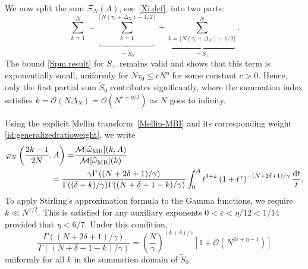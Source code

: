 \documentclass[pdflatex,sn-mathphys-num]{sn-jnl}
\theoremstyle{thmstyleone}
\numberwithin{equation}{section}
\begin{document}
We now split the sum $\Xi_N(A)$, see~\eqref{Xi.def}, into two parts:
\begin{equation}
    \sum_{k=1}^N=\underbrace{\sum_{k=1}^{\lceil N(\tau_0+\Delta_N)-1/2\rceil}}_{=\widetilde{S}_0}+\underbrace{\sum_{k=\lceil N(\tau_0+\Delta_N)+1/2\rceil}^{N}}_{=S_+}.
\end{equation}
The bound \eqref{Spm.result} for $S_+$ remains valid and shows that this term is exponentially small, uniformly for $N\tau_0\leq c N^{\eta}$ for some constant $c>0$.
Hence, only the first partial sum $\widetilde{S}_{0}$ contributes significantly, where the summation index satisfies $k=\mathcal{O}(N\Delta_N)=\mathcal{O}(N^{\varepsilon+\eta/2})$ as $N$ goes to infinity.


Using the explicit Mellin transform~\eqref{Mellin-MBI} and its corresponding weight \eqref{id:generalizedratioweight}, we write
\begin{equation}
\begin{split}
\varphi_{N}\left(\frac{2k-1}{2N},A\right)=&\frac{\mathcal{M}[\widehat{\omega}_{\mathrm{MB}}](k,A)}{\mathcal{M}[\widehat{\omega}_{\mathrm{MB}}](k)}\\
&\hspace*{-1cm}=\frac{\gamma\Gamma\left( (N + 2\delta + 1)/\gamma \right)}{\Gamma((\delta+k)/\gamma)\Gamma((N+\delta+1-k)/\gamma)}\int_0^A t^{\delta+k} \left(1 + t^\gamma \right)^{ -(N+2\delta+1)/\gamma}\frac{\mathrm{d}t}{t}.
\end{split}
\end{equation}
To apply Stirling's approximation formula to the Gamma functions, we require $k\ll N^{1/2}$. This is satisfied for any auxiliary exponents $0<\varepsilon<\eta/12<1/14$ provided that $\eta<6/7$.
Under this condition, 
\begin{equation}
 \frac{\Gamma\left( (N + 2\delta + 1)/\gamma \right)}{\Gamma((N+\delta+1-k)/\gamma)}=\left(\frac{N}{\gamma}\right)^{(k+\delta)/\gamma}\left[1+\mathcal{O}\left(N^{2\varepsilon+\eta-1}\right)\right]
\end{equation}
uniformly for all $k$ in the summation domain of $\widetilde{S}_0$.
\end{document}
